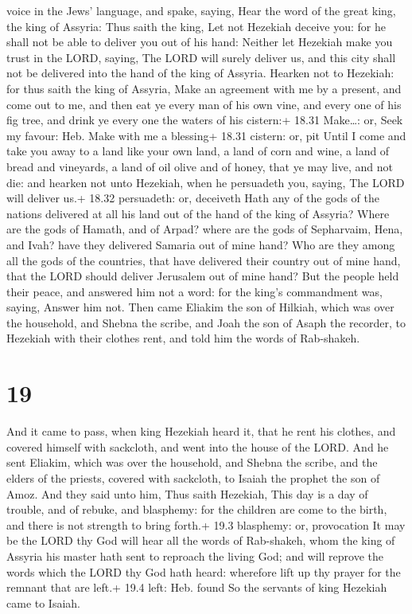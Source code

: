 voice in the Jews' language, and spake, saying, Hear the word of the
great king, the king of Assyria:  Thus saith the king, Let
not Hezekiah deceive you: for he shall not be able to deliver you out of
his hand:  Neither let Hezekiah make you trust in the LORD,
saying, The LORD will surely deliver us, and this city shall not be
delivered into the hand of the king of Assyria.  Hearken
not to Hezekiah: for thus saith the king of Assyria, Make an agreement
with me by a present, and come out to me, and then eat ye every man of
his own vine, and every one of his fig tree, and drink ye every one the
waters of his cistern:+ 18.31 Make\ldots: or, Seek my favour: Heb. Make
with me a blessing+ 18.31 cistern: or, pit  Until I come
and take you away to a land like your own land, a land of corn and wine,
a land of bread and vineyards, a land of oil olive and of honey, that ye
may live, and not die: and hearken not unto Hezekiah, when he persuadeth
you, saying, The LORD will deliver us.+ 18.32 persuadeth: or, deceiveth
 Hath any of the gods of the nations delivered at all his
land out of the hand of the king of Assyria?  Where are the
gods of Hamath, and of Arpad? where are the gods of Sepharvaim, Hena,
and Ivah? have they delivered Samaria out of mine hand? 
Who are they among all the gods of the countries, that have delivered
their country out of mine hand, that the LORD should deliver Jerusalem
out of mine hand?  But the people held their peace, and
answered him not a word: for the king's commandment was, saying, Answer
him not.  Then came Eliakim the son of Hilkiah, which was
over the household, and Shebna the scribe, and Joah the son of Asaph the
recorder, to Hezekiah with their clothes rent, and told him the words of
Rab-shakeh.

\hypertarget{section-18}{%
\section{19}\label{section-18}}

 And it came to pass, when king Hezekiah heard it, that he
rent his clothes, and covered himself with sackcloth, and went into the
house of the LORD.  And he sent Eliakim, which was over the
household, and Shebna the scribe, and the elders of the priests, covered
with sackcloth, to Isaiah the prophet the son of Amoz.  And
they said unto him, Thus saith Hezekiah, This day is a day of trouble,
and of rebuke, and blasphemy: for the children are come to the birth,
and there is not strength to bring forth.+ 19.3 blasphemy: or,
provocation  It may be the LORD thy God will hear all the
words of Rab-shakeh, whom the king of Assyria his master hath sent to
reproach the living God; and will reprove the words which the LORD thy
God hath heard: wherefore lift up thy prayer for the remnant that are
left.+ 19.4 left: Heb. found  So the servants of king
Hezekiah came to Isaiah.

